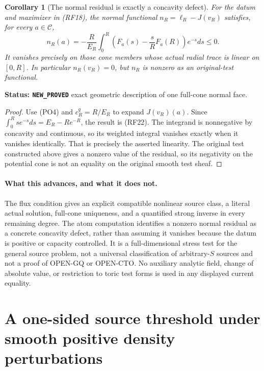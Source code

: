\documentclass[11pt,a4paper]{article}
\numberwithin{equation}{section}
\newtheorem{corollary}[theorem]{Corollary}
\theoremstyle{definition}
\theoremstyle{remark}
\begin{document}
\begin{corollary}[The normal residual is exactly a concavity defect]
\label{cor:r12-radial-atom-normal-concavity}
For the datum and maximizer in \textup{(RF18)}, the
normal functional $n_R=\ell_R-J(v_R)$ satisfies,
for every $a\in\mathscr C$,
\[
 n_R(a)=-\frac R{E_R}\int_0^R
          \left(F_a(s)-\frac{s}{R}F_a(R)\right)e^{-s}ds\le0.
 \tag{RF22}
\]
It vanishes precisely on those cone members whose
actual radial trace is linear on $[0,R]$.
In particular $n_R(v_R)=0$, but $n_R$ is nonzero
as an original-test functional.
\end{corollary}

\noindent\textbf{Status: \texttt{NEW\_PROVED}} exact
geometric description of one full-cone normal face.

\begin{proof}
Use \textup{(PO4)} and $c_R^q=R/E_R$ to expand
$J(v_R)(a)$.  Since
$\int_0^Rse^{-s}ds=E_R-Re^{-R}$, the result is
\textup{(RF22)}.  The integrand is nonnegative by
concavity and continuous, so its weighted integral
vanishes exactly when it vanishes identically.
That is precisely the asserted linearity.  The
original test constructed above gives a nonzero
value of the residual, so its negativity on the
potential cone is not an equality on the original
smooth test sheaf.
\end{proof}

\paragraph{What this advances, and what it does not.}
The flux condition gives an explicit compatible
nonlinear source class, a literal actual solution,
full-cone uniqueness, and a quantified strong inverse
in every remaining degree.  The atom computation
identifies a nonzero normal residual as a concrete
concavity defect, rather than assuming it vanishes
because the datum is positive or capacity controlled.
It is a full-dimensional stress test for the general
source problem, not a universal classification of
arbitrary-$S$ sources and not a proof of OPEN-GQ or
OPEN-CTO.  No auxiliary analytic field, change of
absolute value, or restriction to toric test forms
is used in any displayed current equality.



\section{A one-sided source threshold under smooth positive density perturbations}
\label{sec:r12-smooth-density-source-instability}
\end{document}
